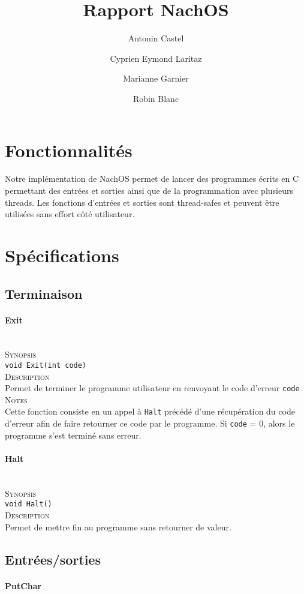 \documentclass{report}
\title{Rapport NachOS}
\author{Antonin Castel \and
		Cyprien Eymond Laritaz \and
		Marianne Garnier \and
		Robin Blanc}
\newcommand{\myparagraph}[1]{\paragraph*{#1}\mbox{}\\}
\begin{document}
\maketitle

\section*{Fonctionnalités}
Notre implémentation de NachOS permet de lancer des programmes écrits en C permettant des entrées et sorties ainsi que de la programmation avec plusieurs threads. Les fonctions d'entrées et sorties sont thread-safes et peuvent être utilisées sans effort côté utilisateur.

\section*{Spécifications}
\subsection*{Terminaison}
\myparagraph{Exit}

\textsc{Synopsis}\\
	\texttt{void Exit(int code)}\\
	
\textsc{Description}\\
	Permet de terminer le programme utilisateur en renvoyant le code d'erreur \texttt{code}\\
	
\textsc{Notes}\\
	Cette fonction consiste en un appel à \texttt{Halt} précédé d'une récupération du code d'erreur afin de faire retourner ce code par le programme. Si \texttt{code} = 0, alors le programme s'est terminé sans erreur.
	
	
	
	
	
\myparagraph{Halt}

\textsc{Synopsis}\\
	\texttt{void Halt()}\\
	
\textsc{Description}\\
	Permet de mettre fin au programme sans retourner de valeur.\\

\subsection*{Entrées/sorties}
\myparagraph{PutChar}
\end{document}
